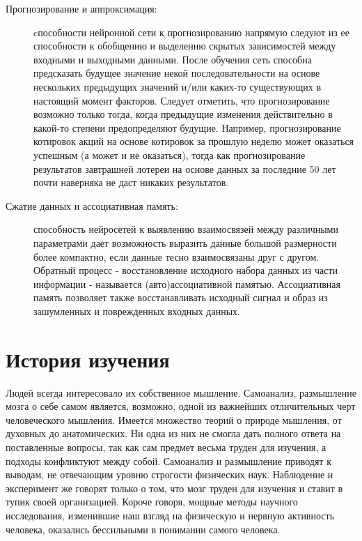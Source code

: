 \documentclass[a4paper,12pt]{report}
\begin{document}
\begin{description}
\item[Прогнозирование и аппроксимация:] cпособности нейронной сети к прогнозированию напрямую следуют из ее способности к обобщению и выделению скрытых зависимостей между входными и выходными данными. После обучения сеть способна предсказать будущее значение некой последовательности на основе нескольких предыдущих значений и/или каких-то существующих в настоящий момент факторов. Следует отметить, что прогнозирование возможно только тогда, когда предыдущие изменения действительно в какой-то степени предопределяют будущие. Например, прогнозирование котировок акций на основе котировок за прошлую неделю может оказаться успешным (а может и не оказаться), тогда как прогнозирование результатов завтрашней лотереи на основе данных за последние 50 лет почти наверняка не даст никаких результатов.

\item[Сжатие данных и ассоциативная память:] способность нейросетей к выявлению взаимосвязей между различными параметрами дает возможность выразить данные большой размерности более компактно, если данные тесно взаимосвязаны друг с другом. Обратный процесс - восстановление исходного набора данных из части информации - называется (авто)ассоциативной памятью. Ассоциативная память позволяет также восстанавливать исходный сигнал и образ из зашумленных и поврежденных входных данных.
\end{description}

\section{История изучения}
Людей всегда интересовало их собственное мышление. Самоанализ, размышление мозга о себе самом является, возможно, одной из важнейших отличительных черт человеческого мышления. Имеется множество теорий о природе мышления, от духовных до анатомических. Ни одна из них не смогла дать полного ответа на поставленные вопросы, так как сам предмет весьма труден для изучения, а подходы конфликтуют между собой. Самоанализ и размышление приводят к выводам, не отвечающим уровню строгости физических наук. Наблюдение и эксперимент же говорят только о том, что мозг труден для изучения и ставит в тупик своей организацией. Короче говоря, мощные методы научного исследования, изменившие наш взгляд на физическую и нервную активность человека, оказались бессильными в понимании самого человека.
\end{document}
